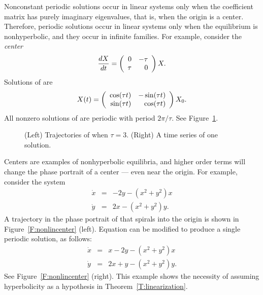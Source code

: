 \documentclass{ximera}
\begin{document}
Nonconstant periodic solutions occur in linear systems only when the
coefficient matrix has purely imaginary eigenvalues, that is,
when the origin is a center.  Therefore, periodic solutions
occur in linear systems only when the equilibrium is
nonhyperbolic, and they occur in infinite families.  For
example, consider the {\em center\/}  
\begin{equation}  \label{e:planeper}
\frac{dX}{dt} = \left(\begin{array}{rr} 0 & -\tau\\ \tau &0\end{array}\right)X.
\end{equation}
Solutions of  are 
\[
X(t) = \left(\begin{array}{rr} \cos(\tau t) & -\sin(\tau t)\\ \sin(\tau t) &\cos(\tau t)\end{array}\right)X_0.
\]
All nonzero solutions of  are periodic with period
$2\pi/\tau$.  See Figure~\ref{F:planarperiodic}.

\begin{figure}[htb]
           \centerline{%
           }
           \caption{(Left) Trajectories of \protect{}
	     when $\tau=3$. (Right) A time series of one solution.}
           \label{F:planarperiodic}
\end{figure}

Centers are examples of nonhyperbolic
equilibria, and higher
order terms will change the 
phase portrait of a center --- even
near the origin.  For example, consider the system  
\begin{equation*}  \label{e:nonlincenter}
\begin{array}{rcl}
\dot{x} & = & -2y -(x^2+y^2)x \\
\dot{y} & = & 2x - (x^2+y^2)y.
\end{array}
\end{equation*}
A trajectory in the phase portrait of  that
spirals into the origin is shown in Figure~\ref{F:nonlincenter}
(left). Equation  can be modified to produce
a single periodic solution, as follows:
\begin{equation*}  \label{e:nonlincenter2}
\begin{array}{rcl}
\dot{x} & = & x-2y -(x^2+y^2)x \\
\dot{y} & = & 2x+y - (x^2+y^2)y.
\end{array}
\end{equation*}
See Figure~\ref{F:nonlincenter} (right).  This example shows the necessity 
of assuming hyperbolicity as a hypothesis in Theorem~\ref{T:linearization}.  
\end{document}
